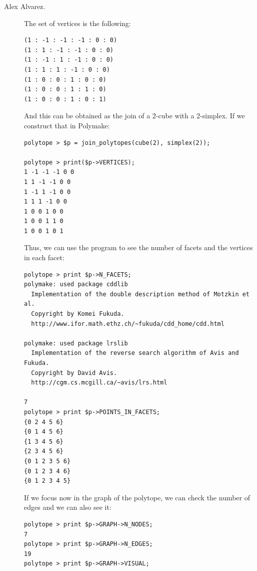 \begin{description}
\item [Alex Alvarez.] The set of vertices is the following:
\begin{verbatim}
(1 : -1 : -1 : -1 : 0 : 0)
(1 : 1 : -1 : -1 : 0 : 0)
(1 : -1 : 1 : -1 : 0 : 0)
(1 : 1 : 1 : -1 : 0 : 0)
(1 : 0 : 0 : 1 : 0 : 0)
(1 : 0 : 0 : 1 : 1 : 0)
(1 : 0 : 0 : 1 : 0 : 1)
\end{verbatim}
And this can be obtained as the join of a 2-cube with a 2-simplex. If we construct that in Polymake:
\begin{verbatim}
polytope > $p = join_polytopes(cube(2), simplex(2));

polytope > print($p->VERTICES);
1 -1 -1 -1 0 0
1 1 -1 -1 0 0
1 -1 1 -1 0 0
1 1 1 -1 0 0
1 0 0 1 0 0
1 0 0 1 1 0
1 0 0 1 0 1
\end{verbatim}

Thus, we can use the program to see the number of facets and the vertices in each facet:

\begin{verbatim}
polytope > print $p->N_FACETS;
polymake: used package cddlib
  Implementation of the double description method of Motzkin et al.
  Copyright by Komei Fukuda.
  http://www.ifor.math.ethz.ch/~fukuda/cdd_home/cdd.html

polymake: used package lrslib
  Implementation of the reverse search algorithm of Avis and Fukuda.
  Copyright by David Avis.
  http://cgm.cs.mcgill.ca/~avis/lrs.html

7
polytope > print $p->POINTS_IN_FACETS;
{0 2 4 5 6}
{0 1 4 5 6}
{1 3 4 5 6}
{2 3 4 5 6}
{0 1 2 3 5 6}
{0 1 2 3 4 6}
{0 1 2 3 4 5}
\end{verbatim}

If we focus now in the graph of the polytope, we can check the number of edges and we can also see it:
\begin{verbatim}
polytope > print $p->GRAPH->N_NODES;
7
polytope > print $p->GRAPH->N_EDGES;
19
polytope > print $p->GRAPH->VISUAL;
\end{verbatim}


\end{description}
